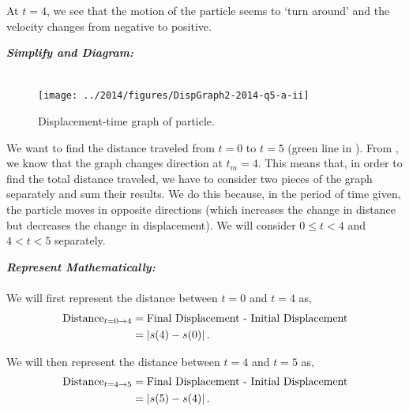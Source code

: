\begin{subquestions}
\begin{subsubquestions}
		At $t=4$, we see that the motion of the particle seems to `turn around' and the velocity changes from negative to positive. 
		
		
		\subsubquestion
		
		\begin{subsubsubquestions}
			
			\subsubsubquestion
			
			\textbf{\textit{Simplify and Diagram:}} \\ \\
			
			\begin{figure}[H]
				\begin{center}
					\texttt{[image: ../2014/figures/DispGraph2-2014-q5-a-ii]}
					\caption{\label{2014:q5*:SGraph2} Displacement-time graph of particle.}
				\end{center}
			\end{figure}
			
			We want to find the distance traveled from $t=0$ to $t=5$ (green line in ). From , we know that the graph changes direction at $t_m=4$. This means that, in order to find the total distance traveled, we have to consider two pieces of the graph separately and sum their results. We do this because, in the period of time given, the particle moves in opposite directions (which increases the change in distance but decreases the change in displacement). We will consider $0 \leq t < 4$ and $4 < t < 5$ separately.
			
			
			
			\textbf{\textit{Represent Mathematically:}} \\ \\
			We will first represent the distance between $t=0$ and $t=4$ as,
			\begin{align}
				\text{Distance}_{t=0 \rightarrow 4} & = \text{Final Displacement - Initial Displacement} \nonumber \\
				& = |s(4)-s(0)| \,.  \label{2014:q5*:Seqn1}
			\end{align}
			
			We will then represent the distance between $t=4$ and $t=5$ as,
			\begin{align}
				\text{Distance}_{t=4 \rightarrow 5} & = \text{Final Displacement - Initial Displacement} \nonumber \\
				& = |s(5)-s(4)| \,.  \label{2014:q5*:Seqn2}
			\end{align}
			

\end{subsubsubquestions}
\end{subsubquestions}
\end{subquestions}
